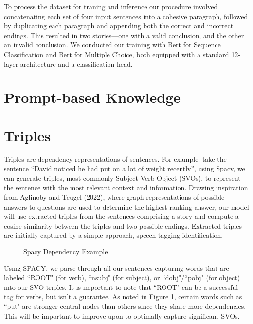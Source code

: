 \documentclass{article}
\begin{document}
\begin{multicols}{2}
To process the dataset for traning and inference our procedure involved concatenating each set of four input sentences into a cohesive paragraph, followed by duplicating each paragraph and appending both the correct and incorrect endings. This resulted in two stories—one with a valid conclusion, and the other an invalid conclusion. We conducted our training with Bert for Sequence Classification and Bert for Multiple Choice, both equipped with a standard 12-layer architecture and a classification head. 

\section{Prompt-based Knowledge}
\lipsum[3-4]

\section{Triples}
Triples are dependency representations of sentences. For example, take the sentence ``David noticed he had put on a lot of weight recently'', using Spacy, we can generate triples, 
most commonly Subject-Verb-Object (SVOs), to represent the sentence with the most relevant context and information. Drawing inspiration from 
Aglinoby and Teugel (2022), where graph representations of possible answers to questions are used to determine the highest ranking answer, our model will use 
extracted triples from the sentences comprising a story and compute a cosine similarity between the triples and two possible endings. Extracted 
triples are initially captured by a simple approach, speech tagging identification.

\begin{figure}[H]
    \centering
    \caption{Spacy Dependency Example}
\end{figure}

Using SPACY, we parse through all our sentences capturing words that are labeled ``ROOT" (for verb), ``nsubj" (for subject), or ``dobj"/``pobj" (for object) 
into our SVO triples. It is important to note that ``ROOT" can be a successful tag for verbs, but isn't a guarantee. As noted in Figure 1, certain words 
such as ``put" are stronger central nodes than others since they share more dependencies.  This will be important to improve upon to optimally capture 
significant SVOs.


\end{multicols}
\end{document}
